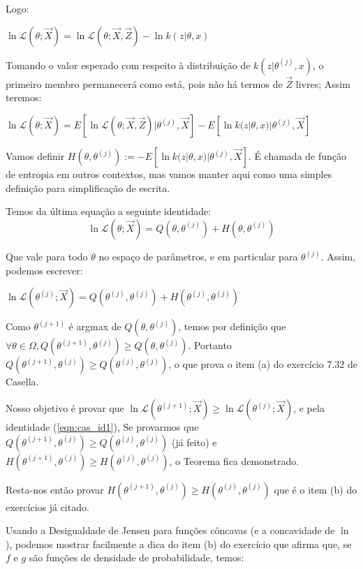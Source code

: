 \documentclass[12pt]{article}
\newcommand{\lik}{\mathcal{L}}
\begin{document}
Logo:

$\ln \lik (\theta;\vec X) = \ln \lik (\theta;\vec X,\vec Z) - \ln k(z|\theta,x) $

Tomando o valor esperado\cite{CaseBerg:01} com respeito à distribuição de $k(z|\theta^{(j)},x)$, o primeiro membro permanecerá como está, pois não há termos de $\vec Z$ livres; Assim teremos:

$\ln \lik (\theta;\vec X) = E[\ln \lik (\theta;\vec X,\vec Z)|\theta^{(j)},\vec X] - E[\ln k(z|\theta,x)|\theta^{(j)},\vec X]$

Vamos definir $H(\theta,\theta^{(j)}):=-E[\ln k(z|\theta,x)|\theta^{(j)},\vec X]$. É chamada de função de entropia\cite{wiki_exp} em outros contextos, mas vamos manter aqui como uma simples definição para simplificação de escrita.

Temos da última equação a seguinte identidade:
\begin{equation}
    \label{eqn:cas_id1}
    \ln \lik (\theta;\vec X) = Q(\theta,\theta^{(j)}) + H(\theta,\theta^{(j)})
\end{equation}

Que vale para todo $\theta$ no espaço de parâmetros, e em particular para $\theta^{(j)}$. Assim, podemos escrever:

$\ln \lik (\theta^{(j)};\vec X) = Q(\theta^{(j)},\theta^{(j)}) + H(\theta^{(j)},\theta^{(j)})$

Como $\theta^{(j+1)}$ é argmax de $Q(\theta,\theta^{(j)})$, temos por definição que $\forall \theta \in \Omega,Q(\theta^{(j+1)},\theta^{(j)})\geq Q(\theta,\theta^{(j)})$. Portanto $Q(\theta^{(j+1)},\theta^{(j)})\geq Q(\theta^{(j)},\theta^{(j)})$, o que prova o item (a) do exercício 7.32 de Casella\cite{CaseBerg_ex}.

Nosso objetivo é provar que $\ln \lik (\theta^{(j+1)};\vec X)\geq \ln \lik (\theta^{(j)};\vec X)$, e pela identidade (\ref{eqn:cas_id1}), Se provarmos que $Q(\theta^{(j+1)},\theta^{(j)})\geq Q(\theta^{(j)},\theta^{(j)})$ (já feito) e $H(\theta^{(j+1)},\theta^{(j)})\geq H(\theta^{(j)},\theta^{(j)})$, o Teorema fica demonstrado.

Resta-nos então provar $H(\theta^{(j+1)},\theta^{(j)})\geq H(\theta^{(j)},\theta^{(j)})$ que é o item (b) do exercícios já citado.

Usando a Desigualdade de Jensen\cite{CaseBerg_jens} para funções côncavas (e a concavidade de $\ln$), podemos mostrar facilmente a dica do item (b) do exercício que afirma que, se $f$ e $g$ são funções de densidade de probabilidade, temos:
\end{document}
